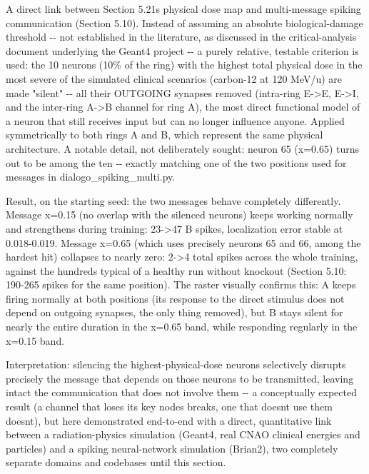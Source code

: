\documentclass[
  english,
]{article}
\begin{document}
A direct link between Section 5.21\textquotesingle s physical dose map and multi-message spiking communication (Section 5.10). Instead of assuming an absolute biological-damage threshold -\/- not established in the literature, as discussed in the critical-analysis document underlying the Geant4 project -\/- a purely relative, testable criterion is used: the 10 neurons (10\% of the ring) with the highest total physical dose in the most severe of the simulated clinical scenarios (carbon-12 at 120 MeV/u) are made "silent" -\/- all their OUTGOING synapses removed (intra-ring E-\textgreater E, E-\textgreater I, and the inter-ring A-\textgreater B channel for ring A), the most direct functional model of a neuron that still receives input but can no longer influence anyone. Applied symmetrically to both rings A and B, which represent the same physical architecture. A notable detail, not deliberately sought: neuron 65 (x=0.65) turns out to be among the ten -\/- exactly matching one of the two positions used for messages in dialogo\_\allowbreak{}spiking\_\allowbreak{}multi.py.

Result, on the starting seed: the two messages behave completely differently. Message x=0.15 (no overlap with the silenced neurons) keeps working normally and strengthens during training: 23-\textgreater47 B spikes, localization error stable at 0.018-0.019. Message x=0.65 (which uses precisely neurons 65 and 66, among the hardest hit) collapses to nearly zero: 2-\textgreater4 total spikes across the whole training, against the hundreds typical of a healthy run without knockout (Section 5.10: 190-265 spikes for the same position). The raster visually confirms this: A keeps firing normally at both positions (its response to the direct stimulus does not depend on outgoing synapses, the only thing removed), but B stays silent for nearly the entire duration in the x=0.65 band, while responding regularly in the x=0.15 band.

Interpretation: silencing the highest-physical-dose neurons selectively disrupts precisely the message that depends on those neurons to be transmitted, leaving intact the communication that does not involve them -\/- a conceptually expected result (a channel that loses its key nodes breaks, one that doesn\textquotesingle t use them doesn\textquotesingle t), but here demonstrated end-to-end with a direct, quantitative link between a radiation-physics simulation (Geant4, real CNAO clinical energies and particles) and a spiking neural-network simulation (Brian2), two completely separate domains and codebases until this section.
\end{document}
